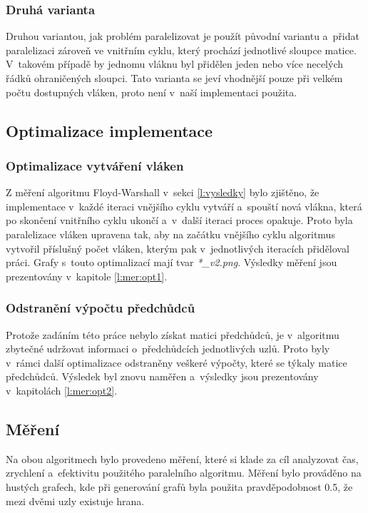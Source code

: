 \subsubsection{Druhá varianta}
Druhou variantou, jak problém paralelizovat je použít původní variantu a~přidat paralelizaci zároveň ve vnitřním cyklu, který prochází jednotlivé sloupce matice. V~takovém případě by jednomu vláknu byl přidělen jeden nebo více necelých řádků ohraničených sloupci. Tato varianta se jeví vhodnější pouze při velkém počtu dostupných vláken, proto není v~naší implementaci použita.

\subsection{Optimalizace implementace}
\subsubsection{Optimalizace vytváření vláken} \label{l:opt1}
Z měření algoritmu Floyd-Warshall v~sekci \ref{l:vysledky} bylo zjištěno, že implementace v~každé iteraci vnějšího cyklu vytváří a~spouští nová vlákna, která po skončení vnitřního cyklu ukončí a~v~další iteraci proces opakuje. Proto byla paralelizace vláken upravena tak, aby na začátku vnějšího cyklu algoritmus vytvořil příslušný počet vláken, kterým pak v~jednotlivých iteracích přiděloval práci. Grafy s~touto optimalizací mají tvar \textit{*\_v2.png}. Výsledky měření jsou prezentovány v~kapitole \ref{l:mer:opt1}.

\subsubsection{Odstranění výpočtu předchůdců} \label{l:opt2}
Protože zadáním této práce nebylo získat matici předchůdců, je v~algoritmu zbytečné udržovat informaci o~předchůdcích jednotlivých uzlů. Proto byly v~rámci další optimalizace odstraněny veškeré výpočty, které se týkaly matice předchůdců. Výsledek byl znovu naměřen a~výsledky jsou prezentovány v~kapitolách \ref{l:mer:opt2}.


\subsection{Měření}
Na obou algoritmech bylo provedeno měření, které si klade za cíl analyzovat čas, zrychlení a~efektivitu použitého paralelního algoritmu. Měření bylo prováděno na hustých grafech, kde při generování grafů byla použita pravděpodobnost 0.5, že mezi dvěmi uzly existuje hrana.


